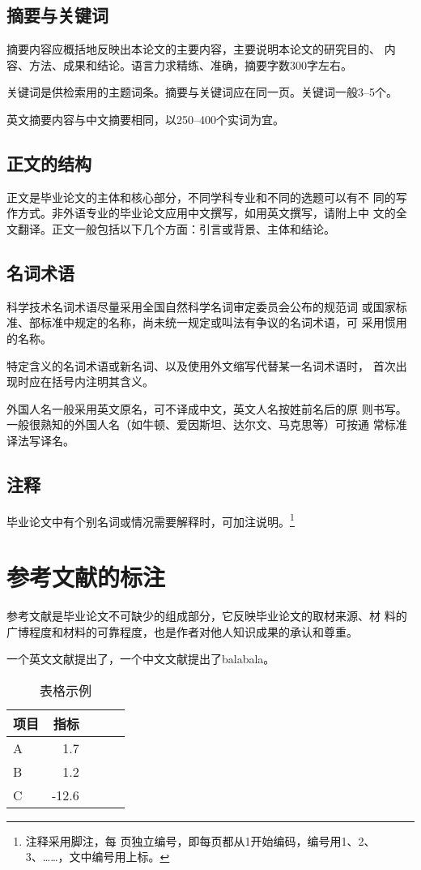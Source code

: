 \documentclass{swufethesis}
\begin{document}
\section{摘要与关键词}
摘要内容应概括地反映出本论文的主要内容，主要说明本论文的研究目的、
内容、方法、成果和结论。语言力求精练、准确，摘要字数300字左右。

关键词是供检索用的主题词条。摘要与关键词应在同一页。关键词一般3--5个。

英文摘要内容与中文摘要相同，以250--400个实词为宜。

\section{正文的结构}
正文是毕业论文的主体和核心部分，不同学科专业和不同的选题可以有不
同的写作方式。非外语专业的毕业论文应用中文撰写，如用英文撰写，请附上中
文的全文翻译。正文一般包括以下几个方面：引言或背景、主体和结论。

\section{名词术语}
科学技术名词术语尽量采用全国自然科学名词审定委员会公布的规范词
或国家标准、部标准中规定的名称，尚未统一规定或叫法有争议的名词术语，可
采用惯用的名称。

特定含义的名词术语或新名词、以及使用外文缩写代替某一名词术语时，
首次出现时应在括号内注明其含义。

外国人名一般采用英文原名，可不译成中文，英文人名按姓前名后的原
则书写。一般很熟知的外国人名（如牛顿、爱因斯坦、达尔文、马克思等）可按通
常标准译法写译名。

\section{注释}
毕业论文中有个别名词或情况需要解释时，可加注说明。\footnote{注释采用脚注，每
  页独立编号，即每页都从1开始编码，编号用1、2、3、……，文中编号用上标。}

\chapter{参考文献的标注}
参考文献是毕业论文不可缺少的组成部分，它反映毕业论文的取材来源、材
料的广博程度和材料的可靠程度，也是作者对他人知识成果的承认和尊重。

一个英文文献\cite{dirac}提出了，一个中文文献\cite{蔡敏2006--}提出了balabala。

\begin{table}[htb]
  \caption{表格示例}
  \centering
  \begin{tabular}{lrrrr}
    \toprule
    项目 & 指标  \\
    \midrule
    A    & 1.7   \\
    B    & 1.2   \\
    C    & -12.6 \\
    \bottomrule
  \end{tabular}
\end{table}
\end{document}
